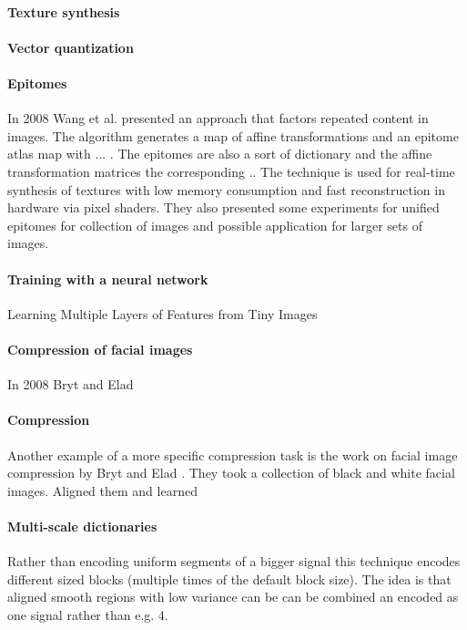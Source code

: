 \paragraph{Texture synthesis}\cite{Peyre2008}

\paragraph{Vector quantization}

\paragraph{Epitomes} In 2008 Wang et al.\cite{Wang2008a} presented
an approach that factors repeated content in images. The algorithm generates 
a map of affine transformations and an epitome atlas map with ... . The
epitomes are also a sort of dictionary and the affine transformation matrices
the corresponding .. The technique is used for real-time synthesis of textures
with low memory consumption and  fast reconstruction in hardware via pixel
shaders. They also presented some experiments for unified epitomes for
collection of images and possible application for larger sets of images. 

\paragraph{Training with a neural network}
Learning Multiple Layers of Features from Tiny Images \cite{Krizhevsky2009}

\paragraph{Compression of facial images}
In 2008 Bryt and Elad \cite{Bryt2008} 
\paragraph{Compression} \cite{Lewicki1999,Murray2006}  
Another example of a more specific compression task is the
work on facial image compression by Bryt and Elad \cite{Bryt2008}. 
They took a collection of black and white facial images. Aligned them and
learned  

\paragraph{Multi-scale dictionaries}
Rather than encoding uniform segments of a bigger signal this technique
encodes different sized blocks (multiple times of the default block size). The
idea is that aligned smooth regions with low variance can be can be combined an
encoded as one signal rather than e.g. 4. \cite{saprioSlides}\cite{Mairal2007}

